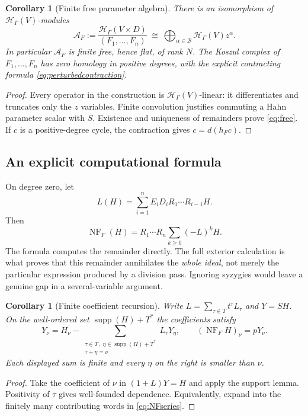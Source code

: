 \documentclass[11pt,letterpaper]{article}
\newtheorem{corollary}[theorem]{Corollary}
\theoremstyle{definition}
\theoremstyle{remark}
\newcommand{\HH}{\mathcal H}
\newcommand{\BB}{\mathcal B}
\newcommand{\supp}{\operatorname{supp}}
\newcommand{\NF}{\operatorname{NF}}
\numberwithin{equation}{section}
\begin{document}
\begin{corollary}[Finite free parameter algebra]\label{cor:free}
There is an isomorphism of $\HH_\Gamma(V)$-modules
\begin{equation}\label{eq:free}
 \mathcal A_F:=\frac{\HH_\Gamma(V\times D)}{(F_1,\ldots,F_n)}
 \ \cong\ \bigoplus_{\alpha\in\BB}\HH_\Gamma(V)z^\alpha.
\end{equation}
In particular $\mathcal A_F$ is finite free, hence flat, of rank $N$. The Koszul complex of $F_1,\ldots,F_n$ has zero homology in positive degrees, with the explicit contracting formula \eqref{eq:perturbedcontraction}.
\end{corollary}
\begin{proof}
Every operator in the construction is $\HH_\Gamma(V)$-linear: it differentiates and truncates only the $z$ variables. Finite convolution justifies commuting a Hahn parameter scalar with $S$. Existence and uniqueness of remainders prove \eqref{eq:free}. If $c$ is a positive-degree cycle, the contraction gives $c=d(h_Fc)$.
\end{proof}

\subsection{An explicit computational formula}
On degree zero, let
\begin{equation}\label{eq:L}
 L(H)=\sum_{i=1}^nE_iD_iR_1\cdots R_{i-1}H.
\end{equation}
Then
\begin{equation}\label{eq:NFseries}
 \NF_F(H)=R_1\cdots R_n\sum_{k\ge0}(-L)^kH.
\end{equation}
The formula computes the remainder directly. The full exterior calculation is what proves that this remainder annihilates the \emph{whole ideal}, not merely the particular expression produced by a division pass. Ignoring syzygies would leave a genuine gap in a several-variable argument.

\begin{corollary}[Finite coefficient recursion]\label{cor:recursion}
Write $L=\sum_{\tau\in T}t^\tau L_\tau$ and $Y=SH$. On the well-ordered set $\supp(H)+T^*$ the coefficients satisfy
\begin{equation}\label{eq:recursion}
 Y_\nu=H_\nu-\sum_{\substack{\tau\in T\,,\ \eta\in\supp(H)+T^*\\ \tau+\eta=\nu}}L_\tau Y_\eta,
 \qquad (\NF_FH)_\nu=pY_\nu.
\end{equation}
Each displayed sum is finite and every $\eta$ on the right is smaller than $\nu$.
\end{corollary}
\begin{proof}
Take the coefficient of $\nu$ in $(1+L)Y=H$ and apply the support lemma. Positivity of $\tau$ gives well-founded dependence. Equivalently, expand into the finitely many contributing words in \eqref{eq:NFseries}.
\end{proof}
\end{document}
